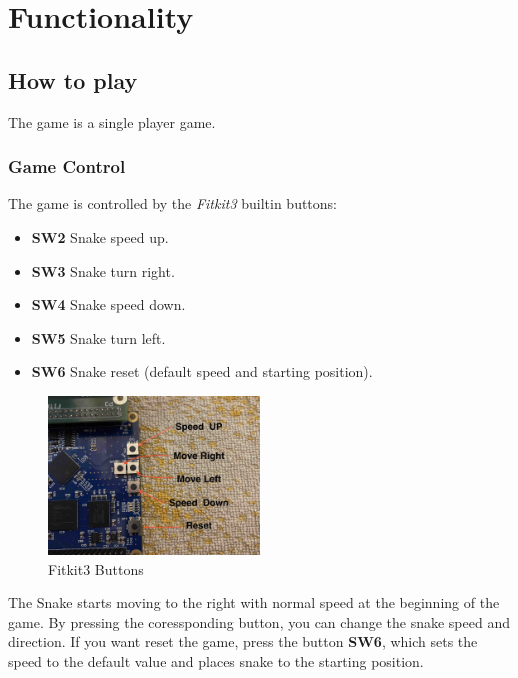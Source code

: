 \documentclass[a4paper, 11pt]{article}
\begin{document}


    \section{Functionality}\label{sec:functionality}

    \subsection{How to play}\label{subsec:functionality-of-the-game}
    The game is a single player game.


    \subsubsection{Game Control}\label{sbsubsec:controling}
    The game is controlled by the \textit{Fitkit3} built\-in buttons:
    \begin{itemize}
        \item \textbf{SW2} \- Snake speed up.
        \item \textbf{SW3} \- Snake turn right.
        \item \textbf{SW4} \- Snake speed down.
        \item \textbf{SW5} \- Snake turn left.
        \item \textbf{SW6} \- Snake reset (default speed and starting position).
    \end{itemize}

    \begin{figure}[H]
        \centering
        \includegraphics[width=0.5\textwidth]{buttons}
        \caption{Fitkit3 Buttons}\label{fig:figure2}
    \end{figure}

    The Snake starts moving to the right with normal speed
    at the beginning of the game.
    By pressing the coressponding button, you can change the snake speed and direction.
    If you want reset the game, press the button \textbf{SW6}, which sets
    the speed to the default value and places snake to the starting position.
\end{document}
